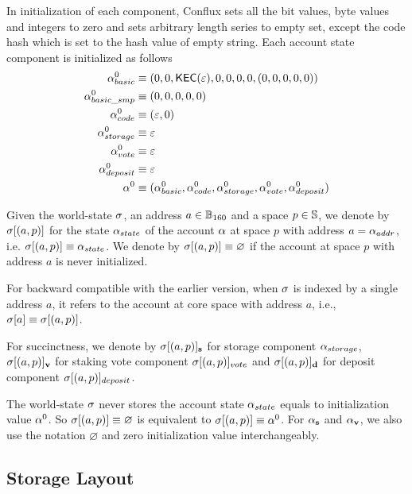 In initialization of each component, Conflux sets all the bit values, byte values and integers to zero and sets arbitrary length series to empty set, except the code hash which is set to the hash value of empty string. Each account state component is initialized as follows
\begin{align}
	\mathbf{\alpha}^0_{basic} &\equiv (0,0,\mathsf{KEC}(\mathbb{\varepsilon}),0,0,0,0,(0,0,0,0,0)) \\
	\mathbf{\alpha}^0_{basic\_smp} &\equiv (0,0,0,0,0) \\
	\mathbf{\alpha}^0_{code} &\equiv (\varepsilon,0) \\
	\mathbf{\alpha}^0_{storage} &\equiv \varepsilon \\
	\mathbf{\alpha}^0_{vote} &\equiv \varepsilon \\
	\mathbf{\alpha}^0_{deposit} &\equiv \varepsilon \\
	\mathbf{\alpha}^0 & \equiv (\mathbf{\alpha}^0_{basic},\mathbf{\alpha}^0_{code},\mathbf{\alpha}^0_{storage},\mathbf{\alpha}^0_{vote},\mathbf{\alpha}^0_{deposit})\label{eq:default_account}
\end{align}

%
Given the {\name} world-state $\mathbf{\sigma}$, an address $a\in\mathbb{B}_{160}$ and a space $p\in \mathbb{S}$, we denote by $\mathbf{\sigma} [(a,p)]$ for the state $\mathbf{\alpha}_{state}$ of the account $\mathbf{\alpha}$ at space $p$ with address $a=\mathbf{\alpha}_{addr}$, i.e. $\mathbf{\sigma} [(a,p)] \equiv \mathbf{\alpha}_{state}$.
We denote by $\mathbf{\sigma}[(a,p)]\equiv \varnothing$ if the account at space $p$ with address $a$ is never initialized. 

For backward compatible with the earlier version, when $\mathbf{\sigma}$ is indexed by a single address $a$, it refers to the account at core space with address $a$, i.e., $\mathbf{\sigma}[a]\equiv\mathbf{\sigma}[(a,p)]$.

For succinctness, we denote by $\mathbf{\sigma}[(a,p)]_{\bf s}$ for storage component $\mathbf{\alpha}_{storage}$, $\mathbf{\sigma}[(a,p)]_{\bf v}$ for staking vote component $\mathbf{\sigma}[(a,p)]_{vote}$ and $\mathbf{\sigma}[(a,p)]_{\bf d}$ for deposit component $\mathbf{\sigma}[(a,p)]_{deposit}$. 

The world-state $\mathbf{\sigma}$ never stores the account state $\mathbf{\alpha}_{state}$ equals to initialization value $\mathbf{\alpha}^0$. So $\mathbf{\sigma}[(a,p)]\equiv \varnothing$ is equivalent to $\mathbf{\sigma}[(a,p)]\equiv \mathbf{\alpha}^0$. For $\mathbf{\alpha}_{\bf s}$ and $\mathbf{\alpha}_{\bf v}$, we also use the notation $\varnothing$ and zero initialization value interchangeably.

\subsection{Storage Layout}

